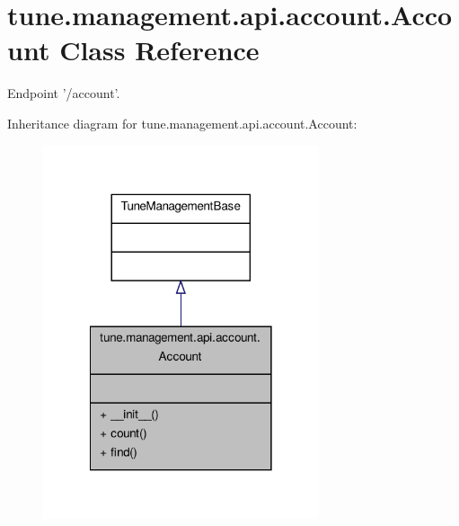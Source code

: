 \hypertarget{classtune_1_1management_1_1api_1_1account_1_1Account}{\section{tune.\-management.\-api.\-account.\-Account Class Reference}
\label{classtune_1_1management_1_1api_1_1account_1_1Account}
}


Endpoint '/account'.  




Inheritance diagram for tune.\-management.\-api.\-account.\-Account\-:
\nopagebreak
\begin{figure}[H]
\begin{center}
\leavevmode
\includegraphics[width=230pt]{classtune_1_1management_1_1api_1_1account_1_1Account__inherit__graph}
\end{center}
\end{figure}


